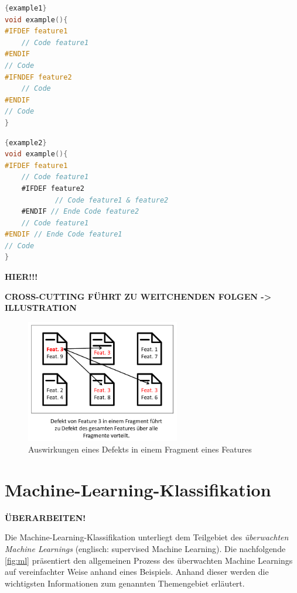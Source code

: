 \noindent\begin{minipage}{.45\textwidth}
\begin{lstlisting}[caption=Beispieleinsätze von \texttt{\#IFDEF} und \texttt{\#IFNDEF},frame=tlrb,language=C, label=example1]{example1}
void example(){
#IFDEF feature1
	// Code feature1
#ENDIF
// Code
#IFNDEF feature2
	// Code
#ENDIF
// Code
}
\end{lstlisting}
\end{minipage}\hfill
\begin{minipage}{.45\textwidth}
\begin{lstlisting}[caption=Beispiel eines verschachtelten Einsatz von \texttt{\#IFDEF},frame=tlrb,language=C, label=example2]{example2}
void example(){
#IFDEF feature1
	// Code feature1
	#IFDEF feature2
			// Code feature1 & feature2
	#ENDIF // Ende Code feature2
	// Code feature1
#ENDIF // Ende Code feature1
// Code
}
\end{lstlisting}
\end{minipage}

\textbf{HIER!!!}
\cite{Stallmann2016}

\textbf{CROSS-CUTTING FÜHRT ZU WEITCHENDEN FOLGEN -> ILLUSTRATION}

\begin{figure}[H]
    \centering
    \includegraphics[width=0.6\textwidth]{images/Crosscutting}
    \caption{Auswirkungen eines Defekts in einem Fragment eines Features\label{fig:cross-cutting}}
\end{figure}

\section{Machine-Learning-Klassifikation}
\label{classification}

\textbf{ÜBERARBEITEN!}

Die Machine-Learning-Klassifikation unterliegt dem Teilgebiet des \emph{überwachten Machine Learnings} (englisch: supervised Machine Learning). Die nachfolgende \autoref{fig:ml} präsentiert den allgemeinen Prozess des überwachten Machine Learnings auf vereinfachter Weise anhand eines Beispiels. Anhand dieser werden die wichtigsten Informationen zum genannten Themengebiet erläutert. 

